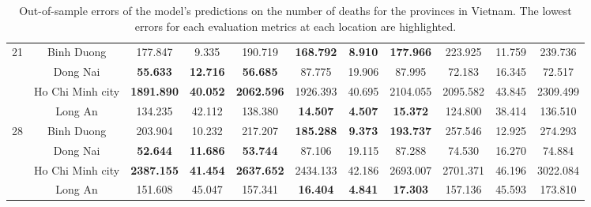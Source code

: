 \begin{landscape}
\begin{table}[!htb]
\begin{tabular}{| c | c | c | c | c | c | c | c | c | c | c |}
        \multirow{4}{*}{21}
            & Binh Duong & 177.847 & 9.335 & 190.719 & \textbf{168.792} & \textbf{8.910} & \textbf{177.966} & 223.925 & 11.759 & 239.736 \\
            & Dong Nai & \textbf{55.633} & \textbf{12.716} & \textbf{56.685} & 87.775 & 19.906 & 87.995 & 72.183 & 16.345 & 72.517 \\
            & Ho Chi Minh city & \textbf{1891.890} & \textbf{40.052} & \textbf{2062.596} & 1926.393 & 40.695 & 2104.055 & 2095.582 & 43.845 & 2309.499 \\
            & Long An & 134.235 & 42.112 & 138.380 & \textbf{14.507} & \textbf{4.507} & \textbf{15.372} & 124.800 & 38.414 & 136.510 \\ \hline

        \multirow{4}{*}{28}
            & Binh Duong & 203.904 & 10.232 & 217.207 & \textbf{185.288} & \textbf{9.373} & \textbf{193.737} & 257.546 & 12.925 & 274.293 \\
            & Dong Nai & \textbf{52.644} & \textbf{11.686} & \textbf{53.744} & 87.106 & 19.115 & 87.288 & 74.530 & 16.270 & 74.884 \\
            & Ho Chi Minh city & \textbf{2387.155} & \textbf{41.454} & \textbf{2637.652} & 2434.133 & 42.186 & 2693.007 & 2701.371 & 46.196 & 3022.084 \\
            & Long An & 151.608 & 45.047 & 157.341 & \textbf{16.404} & \textbf{4.841} & \textbf{17.303} & 157.136 & 45.593 & 173.810 \\ \hline
    \end{tabular}
    \caption{Out-of-sample errors of the model's predictions on the number of deaths for the provinces in Vietnam. The lowest errors for each evaluation metrics at each location are highlighted.}
\end{table}
\end{landscape}

